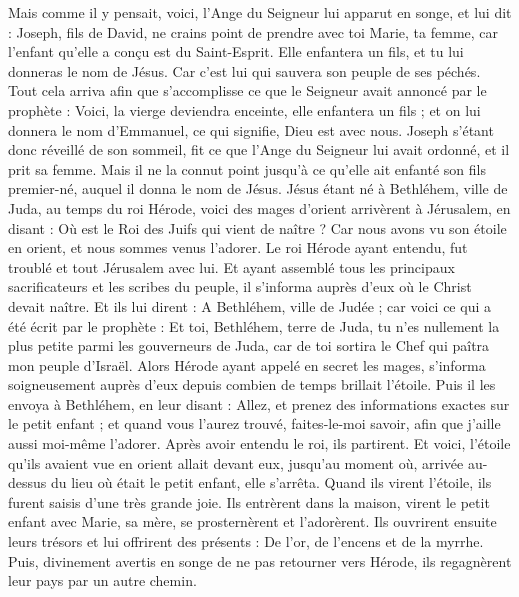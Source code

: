 \begin{multicols}{2}
Mais comme il y pensait, voici, l'Ange du Seigneur lui apparut en songe, et lui dit : Joseph, fils de David, ne crains point de prendre avec toi Marie, ta femme, car l'enfant qu'elle a conçu est du Saint-Esprit.
Elle enfantera un fils, et tu lui donneras le nom de Jésus. Car c'est lui qui sauvera son peuple de ses péchés.
Tout cela arriva afin que s'accomplisse ce que le Seigneur avait annoncé par le prophète :
Voici, la vierge deviendra enceinte, elle enfantera un fils ; et on lui donnera le nom d'Emmanuel, ce qui signifie, Dieu est avec nous.
Joseph s'étant donc réveillé de son sommeil, fit ce que l'Ange du Seigneur lui avait ordonné, et il prit sa femme.
Mais il ne la connut point jusqu'à ce qu'elle ait enfanté son fils premier-né, auquel il donna le nom de Jésus.
\VerseOne{}Jésus étant né à Bethléhem, ville de Juda, au temps du roi Hérode, voici des mages d'orient arrivèrent à Jérusalem,
en disant : Où est le Roi des Juifs qui vient de naître ? Car nous avons vu son étoile en orient, et nous sommes venus l'adorer.
Le roi Hérode ayant entendu, fut troublé et tout Jérusalem avec lui.
Et ayant assemblé tous les principaux sacrificateurs et les scribes du peuple, il s'informa auprès d'eux où le Christ devait naître.
Et ils lui dirent : A Bethléhem, ville de Judée ; car voici ce qui a été écrit par le prophète :
Et toi, Bethléhem, terre de Juda, tu n'es nullement la plus petite parmi les gouverneurs de Juda, car de toi sortira le Chef qui paîtra mon peuple d'Israël.
Alors Hérode ayant appelé en secret les mages, s'informa soigneusement auprès d'eux depuis combien de temps brillait l'étoile.
Puis il les envoya à Bethléhem, en leur disant : Allez, et prenez des informations exactes sur le petit enfant ; et quand vous l'aurez trouvé, faites-le-moi savoir, afin que j'aille aussi moi-même l'adorer.
Après avoir entendu le roi, ils partirent. Et voici, l'étoile qu'ils avaient vue en orient allait devant eux, jusqu'au moment où, arrivée au-dessus du lieu où était le petit enfant, elle s'arrêta.
Quand ils virent l'étoile, ils furent saisis d'une très grande joie.
Ils entrèrent dans la maison, virent le petit enfant avec Marie, sa mère, se prosternèrent et l'adorèrent. Ils ouvrirent ensuite leurs trésors et lui offrirent des présents : De l'or, de l'encens et de la myrrhe.
Puis, divinement avertis en songe de ne pas retourner vers Hérode, ils regagnèrent leur pays par un autre chemin.

\end{multicols}
